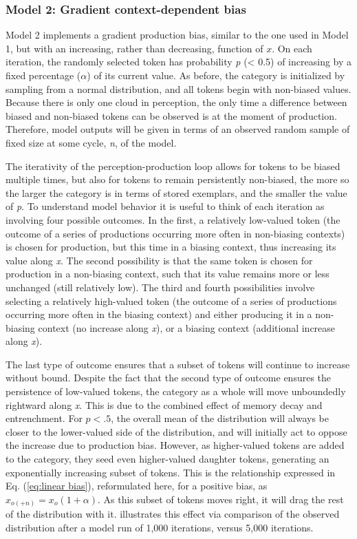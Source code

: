 \subsubsection{\label{subsec:Phrase-Final Lengthening}Model 2: Gradient context-dependent bias}

Model 2 implements a gradient production bias, similar to the one
used in Model 1, but with an increasing, rather than decreasing, function
of $x$. On each iteration, the randomly selected token has probability
\emph{p} (< 0.5) of increasing by a fixed percentage ($\alpha$) of
its current value. As before, the category is initialized by sampling
from a normal distribution, and all tokens begin with non-biased values.
Because there is only one cloud in perception, the only time a difference
between biased and non-biased tokens can be observed is at the moment
of production. Therefore, model outputs will be given in terms of
an observed random sample of fixed size at some cycle, \emph{n}, of
the model.

The iterativity of the perception-production loop allows for tokens
to be biased multiple times, but also for tokens to remain persistently
non-biased, the more so the larger the category is in terms of stored
exemplars, and the smaller the value of \emph{p}. To understand model
behavior it is useful to think of each iteration as involving four
possible outcomes. In the first, a relatively low-valued token (the
outcome of a series of productions occurring more often in non-biasing
contexts) is chosen for production, but this time in a biasing context,
thus increasing its value along \emph{x}. The second possibility is
that the same token is chosen for production in a non-biasing context,
such that its value remains more or less unchanged (still relatively
low). The third and fourth possibilities involve selecting a relatively
high-valued token (the outcome of a series of productions occurring
more often in the biasing context) and either producing it in a non-biasing
context (no increase along \emph{x}), or a biasing context (additional
increase along \emph{x}). 

The last type of outcome ensures that a subset of tokens will continue
to increase without bound. Despite the fact that the second type of
outcome ensures the persistence of low-valued tokens, the category
as a whole will move unboundedly rightward along \emph{x}. This is
due to the combined effect of memory decay and entrenchment. For $p<.5$,
the overall mean of the distribution will always be closer to the
lower-valued side of the distribution, and will initially act to oppose
the increase due to production bias. However, as higher-valued tokens
are added to the category, they seed even higher-valued daughter tokens,
generating an exponentially increasing subset of tokens. This is the
relationship expressed in Eq. (\ref{eq:linear bias}), reformulated
here, for a positive bias, as $x_{o(+n)}=x_{o}(1+\alpha)$. As this
subset of tokens moves right, it will drag the rest of the distribution
with it.  illustrates this effect
via comparison of the observed distribution after a model run of 1,000
iterations, versus 5,000 iterations.

